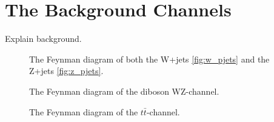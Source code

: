 \section{The Background Channels}
Explain background.
\begin{figure}
    \caption{The Feynman diagram of both the W+jets \ref{fig:w_pjets} and the Z+jets \ref{fig:z_pjets}.}
\end{figure}

\begin{figure}
    \centering
    \caption{The Feynman diagram of the diboson WZ-channel.}
\end{figure}

\begin{figure}
    \centering
    \caption{The Feynman diagram of the $t\bar{t}$-channel.}
\end{figure}

